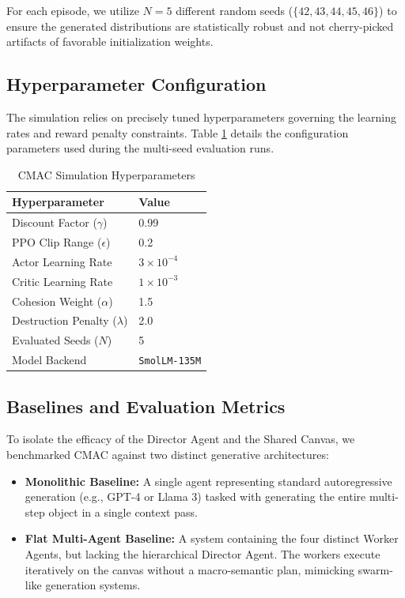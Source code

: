 \documentclass[pdflatex,sn-mathphys-num]{sn-jnl}
\begin{document}
For each episode, we utilize $N=5$ different random seeds ($\{42, 43, 44, 45, 46\}$) to ensure the generated distributions are statistically robust and not cherry-picked artifacts of favorable initialization weights.

\subsection{Hyperparameter Configuration}
The simulation relies on precisely tuned hyperparameters governing the learning rates and reward penalty constraints. Table \ref{tab:hyper} details the configuration parameters used during the multi-seed evaluation runs.

\begin{table}[htbp]
\caption{CMAC Simulation Hyperparameters}
\begin{tabular}{ll}
\toprule
\textbf{Hyperparameter} & \textbf{Value} \\
\midrule
Discount Factor ($\gamma$) & 0.99 \\
PPO Clip Range ($\epsilon$) & 0.2 \\
Actor Learning Rate & $3 \times 10^{-4}$ \\
Critic Learning Rate & $1 \times 10^{-3}$ \\
Cohesion Weight ($\alpha$) & 1.5 \\
Destruction Penalty ($\lambda$) & 2.0 \\
Evaluated Seeds ($N$) & 5 \\
Model Backend & \texttt{SmolLM-135M} \\
\bottomrule
\end{tabular}
\label{tab:hyper}
\end{table}

\subsection{Baselines and Evaluation Metrics}
To isolate the efficacy of the Director Agent and the Shared Canvas, we benchmarked CMAC against two distinct generative architectures:
\begin{itemize}
    \item \textbf{Monolithic Baseline:} A single agent representing standard autoregressive generation (e.g., GPT-4 or Llama 3) tasked with generating the entire multi-step object in a single context pass.
    \item \textbf{Flat Multi-Agent Baseline:} A system containing the four distinct Worker Agents, but lacking the hierarchical Director Agent. The workers execute iteratively on the canvas without a macro-semantic plan, mimicking swarm-like generation systems.
\end{itemize}
\end{document}

